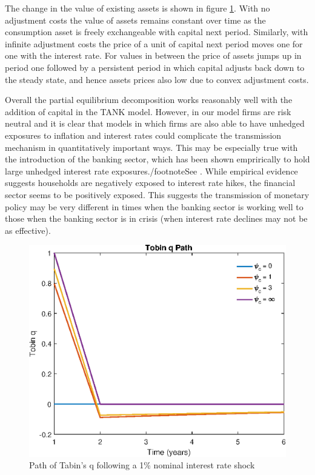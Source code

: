 \documentclass[titlepage]{\econtex}\newcommand{\texname}{ConsumptionHeterogeneity}
\begin{document}


The change in the value of existing assets is shown in figure \ref{fig:PathTobinq}. With no adjustment costs the value of assets remains constant over time as the consumption asset is freely exchangeable with capital next period. Similarly, with infinite adjustment costs the price of a unit of capital next period moves one for one with the interest rate. For values in between the price of assets jumps up in period one followed by a persistent period in which capital adjusts back down to the steady state, and hence assets prices also low due to convex adjustment costs.

Overall the partial equilibrium decomposition works reasonably well with the addition of capital in the TANK model. However, in our model firms are risk neutral and it is clear that models in which firms are also able to have unhedged exposures to inflation and interest rates could complicate the transmission mechanism in quantitatively important ways. This may be especially true with the introduction of the banking sector, which has been shown emprirically to hold large unhedged interest rate exposures./footnote{See \cite{landier_banks_2013}. While empirical evidence suggests households are negatively exposed to interest rate hikes, the financial sector seems to be positively exposed. This suggests the transmission of monetary policy may be very different in times when the banking sector is working well to those when the banking sector is in crisis (when interest rate declines may not be as effective).}

\begin{figure} 
	\begin{centering}
		\includegraphics[scale=0.7]{../Matlab/DynareCode/Figures/TANK_capital_IRF_q.eps}
		\caption{Path of Tabin's q following a 1\% nominal interest rate shock}
		\label{fig:PathTobinq}
	\end{centering}
\end{figure}
\end{document}
